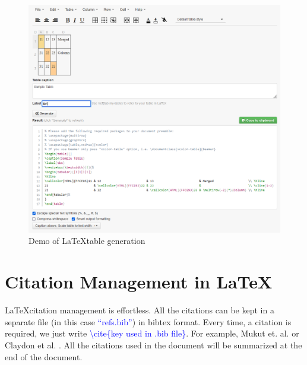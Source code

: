 \documentclass[a4paper, 12pt, one column]{article}
\begin{document}
\begin{figure}[!httb]
    \centering
    \includegraphics[width=0.9\linewidth]{Capture.PNG}
    \caption{ Demo of \LaTeX \space table generation}
    \label{tbDemo}
    \end{figure}

\begin{table}[!httb]
    \caption{A Sample Table}
    \label{tb1}
    \end{table}

\section{Citation Management in \LaTeX}

\LaTeX \space citation management is effortless. All the citations can be kept in a separate file (in this case \textcolor{blue}{``refs.bib''}) in bibtex format. Every time, a citation is required, we just write \textcolor{blue}{ \textbackslash cite\{key used in .bib file\}}. For example, Mukut et. al. \cite{Mukut2022Jul} or Claydon et al. \cite{Claydon17}. All the citations used in the document will be summarized at the end of the document. 
\end{document}
